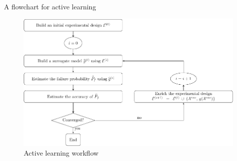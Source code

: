 \begin{frame}
\begin{block}{A flowchart for active learning}
\begin{figure}          \includegraphics[scale=0.7]{figures/figure-activelearning.pdf}   
\caption{Active learning workflow \cite{moustapha2022}}
\end{figure}  
\end{block}    
\end{frame}
